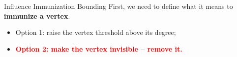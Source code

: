 \documentclass[10pt,aspectratio=169,english]{beamer}
\begin{document}
\begin{frame}{Influence Immunization Bounding}
	First, we need to define what it means to \textbf{immunize a vertex}.
	
	\begin{itemize}
		\item<1-> Option 1: raise the vertex threshold above its degree;
		\item<1-> \textcolor{red}{\textbf{Option 2: make the vertex invisible -- remove it.}}
	\end{itemize}
	
%	
%	
	

\end{frame}
\end{document}
